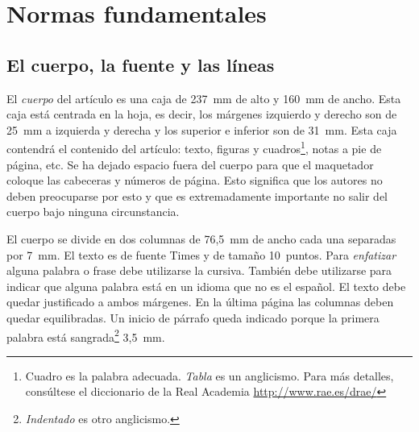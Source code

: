 \documentclass[twocolumn,twoside,a4paper, 10pt]{article}
\begin{document}

\section{Normas fundamentales \label{sec:fund}} 

\subsection{El cuerpo, la fuente y las líneas}

El \emph{cuerpo} del artículo es una caja de 237~mm de alto y 160~mm
de ancho.  Esta caja está centrada en la hoja, es decir, los márgenes
izquierdo y derecho son de 25~mm a izquierda y derecha y los superior
e inferior son de 31~mm.  Esta caja contendrá el contenido del
artículo: texto, figuras y cuadros\footnote{Cuadro es la palabra
adecuada. \emph{Tabla} es un anglicismo.  Para más detalles,
consúltese el diccionario de la Real Academia
\url{http://www.rae.es/drae/}}, notas a pie de página, etc.  Se ha
dejado espacio fuera del cuerpo para que el maquetador coloque las
cabeceras y números de página.  Esto significa que los autores no
deben preocuparse por esto y que es extremadamente importante no 
salir del cuerpo bajo ninguna circunstancia.

El cuerpo se divide en dos columnas de 76,5~mm de ancho cada una 
separadas por 7~mm. El texto es de fuente Times y de tamaño 10~puntos. 
Para \emph{enfatizar} alguna palabra o frase debe utilizarse la 
cursiva. También debe utilizarse para indicar que alguna palabra está 
en un idioma que no es el español. El texto debe quedar justificado a 
ambos márgenes. En la última página las columnas deben quedar 
equilibradas.
Un inicio de párrafo queda indicado porque la primera palabra está
sangrada\footnote{\emph{Indentado} es otro anglicismo.} 3,5~mm.
\end{document}

